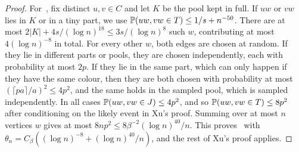 \begin{proof}
For~\cite[(5.3)]{Xu}, fix distinct $u,v\in C$ and let $K$ be the pool kept in full. If $uw$ or $vw$ lies in $K$ or in a tiny part, we use $\mathbb{P}(uw,vw\in T)\le1/s+n^{-50}$. There are at most $2|K|+4s/(\log n)^{18}\le3s/(\log n)^8$ such $w$, contributing at most $4(\log n)^{-8}$ in total. For every other $w$, both edges are chosen at random. If they lie in different parts or pools, they are chosen independently, each with probability at most $2p$. If they lie in the same part, which can only happen if they have the same colour, then they are both chosen with probability at most $(\lceil pa\rceil/a)^2\le4p^2$, and the same holds in the sampled pool, which is sampled independently. In all cases $\mathbb{P}(uw,vw\in J)\le4p^2$, and so $\mathbb{P}(uw,vw\in T)\le8p^2$ after conditioning on the likely event in Xu's proof. Summing over at most $n$ vertices $w$ gives at most $8np^2\le8\beta^{-2}(\log n)^{40}/n$. This proves~\cite[(5.3)]{Xu} with $\theta_n=C_\beta((\log n)^{-8}+(\log n)^{40}/n)$, and the rest of Xu's proof applies.
\end{proof}


